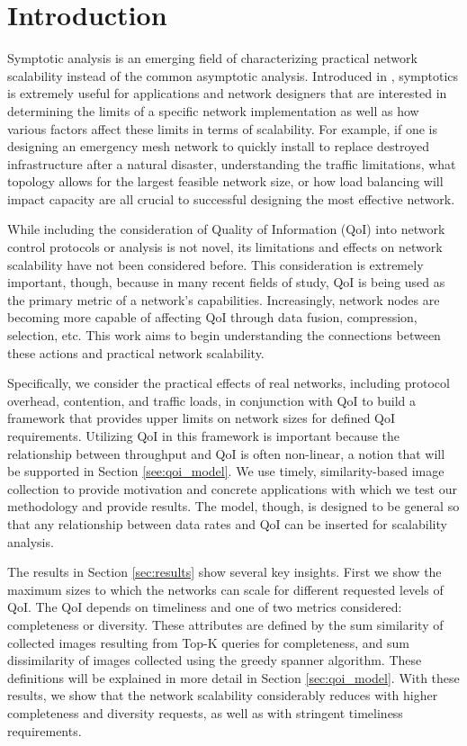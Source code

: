 
\section{Introduction}
\label{sec:intro}

Symptotic analysis is an emerging field of characterizing practical network scalability instead of the common asymptotic analysis.  Introduced in \cite{scalability_manets_theory_vs_practice}, symptotics is extremely useful for applications and network designers that are interested in determining the limits of a specific network implementation as well as how various factors affect these limits in terms of scalability.  For example, if one is designing an emergency mesh network to quickly install to replace destroyed infrastructure after a natural disaster, understanding the traffic limitations, what topology allows for the largest feasible network size, or how load balancing will impact capacity are all crucial to successful designing the most effective network.

While including the consideration of Quality of Information (QoI) into network control protocols or analysis is not novel, its limitations and effects on network scalability have not been considered before.  This consideration is extremely important, though, because in many recent fields of study, QoI is being used as the primary metric of a network's capabilities.  Increasingly, network nodes are becoming more capable of affecting QoI through data fusion, compression, selection, etc.  This work aims to begin understanding the connections between these actions and practical network scalability.

Specifically, we consider the practical effects of real networks, including protocol overhead, contention, and traffic loads, in conjunction with QoI to build a framework that provides upper limits on network sizes for defined QoI requirements.  Utilizing QoI in this framework is important because the relationship between throughput and QoI is often non-linear, a notion that will be supported in Section \ref{see:qoi_model}.  We use timely, similarity-based image collection to provide motivation and concrete applications with which we test our methodology and provide results.  The model, though, is designed to be general so that any relationship between data rates and QoI can be inserted for scalability analysis.

The results in Section \ref{sec:results} show several key insights.  First we show the maximum sizes to which the networks can scale for different requested levels of QoI. The QoI depends on timeliness and one of two metrics considered: completeness or diversity.  These attributes are defined by the sum similarity of collected images resulting from Top-K queries for completeness, and sum dissimilarity of images collected using the greedy spanner algorithm.  These definitions will be explained in more detail in Section \ref{sec:qoi_model}.  With these results, we show that the network scalability considerably reduces with higher completeness and diversity requests, as well as with stringent timeliness requirements.  

